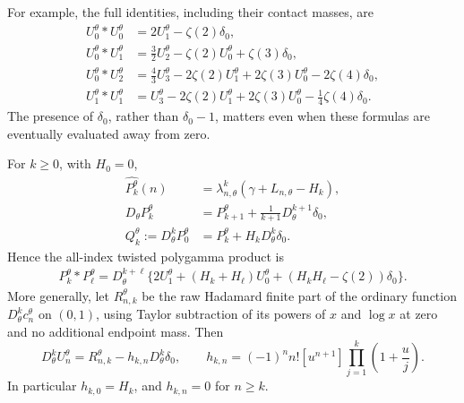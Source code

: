 For example, the full identities, including their contact masses, are
\begin{align}
 U_0^\theta*U_0^\theta
   &=2U_1^\theta-\zeta(2)\delta_0,\label{tw:eq:00}\\
 U_0^\theta*U_1^\theta
   &=\tfrac32U_2^\theta-\zeta(2)U_0^\theta
                                      +\zeta(3)\delta_0,\label{tw:eq:01}\\
 U_0^\theta*U_2^\theta
   &=\tfrac43U_3^\theta-2\zeta(2)U_1^\theta
           +2\zeta(3)U_0^\theta-2\zeta(4)\delta_0,\label{tw:eq:02}\\
 U_1^\theta*U_1^\theta
   &=U_3^\theta-2\zeta(2)U_1^\theta
           +2\zeta(3)U_0^\theta-\tfrac14\zeta(4)\delta_0.
 \label{tw:eq:11}
\end{align}
The presence of $\delta_0$, rather than $\delta_0-1$, matters even
when these formulas are eventually evaluated away from zero.

\begin{theorem}
\label{tw:thm:contacts}
For $k\ge0$, with $H_0=0$,
\begin{align}
 \widehat{P_k^\theta}(n)
   &=\lambda_{n,\theta}^k
                 (\gamma+L_{n,\theta}-H_k),\label{tw:eq:PFourier}\\
 D_\theta P_k^\theta
   &=P_{k+1}^\theta+\frac{1}{k+1}D_\theta^{k+1}\delta_0,
 \label{tw:eq:DP}\\
 Q_k^\theta:=D_\theta^kP_0^\theta
   &=P_k^\theta+H_kD_\theta^k\delta_0.
 \label{tw:eq:Q}
\end{align}
Hence the all-index twisted polygamma product is
\begin{align}
 P_k^\theta*P_\ell^\theta
  =D_\theta^{k+\ell}\bigl\{
      2U_1^\theta+(H_k+H_\ell)U_0^\theta
                 +(H_kH_\ell-\zeta(2))\delta_0\bigr\}.
 \label{tw:eq:polygammaproduct}
\end{align}
More generally, let $R_{n,k}^\theta$ be the raw Hadamard finite part
of the ordinary function $D_\theta^kc_n^\theta$ on $(0,1)$, using
Taylor subtraction of its powers of $x$ and $\log x$ at zero and no
additional endpoint mass. Then
\begin{equation}\label{tw:eq:allcontacts}
 D_\theta^kU_n^\theta
 =R_{n,k}^\theta-h_{k,n}D_\theta^k\delta_0,
 \qquad
 h_{k,n}=(-1)^n n![u^{n+1}]
                         \prod_{j=1}^k\left(1+\frac{u}{j}\right).
\end{equation}
In particular $h_{k,0}=H_k$, and $h_{k,n}=0$ for $n\ge k$.
\end{theorem}

